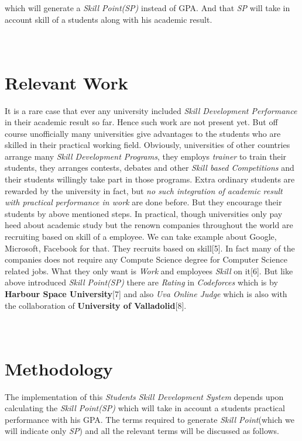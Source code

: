 \documentclass[conference]{IEEEtran}
\begin{document}
which will generate a \textit{Skill Point(SP)} instead of GPA. And that \textit{SP} will take in account skill of a students along with his academic result.\\\\\\ 


\section{Relevant Work}
It is a rare case that ever any university included \textit{Skill Development Performance} in their academic result so far. Hence such work are not present yet. But off course unofficially many universities give advantages to the students who are skilled in their practical working field. Obviously, universities of other countries arrange many \textit{Skill Development Programs}, they employs \textit{trainer} to train their students, they arranges contests, debates and other \textit{Skill based Competitions} and their students willingly take part in those programs. Extra ordinary students are rewarded by the university in fact, but \textit{no such integration of academic result with practical performance in work} are done before. But they encourage their students by above mentioned steps. In practical, though universities only pay heed about academic study but the renown companies throughout the world are recruiting based on skill of a employee. We can take example about Google, Microsoft, Facebook for that. They recruits based on skill[5]. In fact many of the companies does not require any Compute Science degree for Computer Science related jobs. What they only want is \textit{Work} and employees \textit{Skill} on it[6]. But like above introduced \textit{Skill Point(SP)} there are \textit{Rating} in \textit{Codeforces} which is by \textbf{Harbour Space University}[7] and also \textit{Uva Online Judge} which is also with the collaboration of \textbf{University of Valladolid}[8]. \\\\\\

\section{Methodology}
The implementation of this \textit{Students Skill Development System} depends upon calculating the \textit{Skill Point(SP)} which will take in account a students practical performance with his GPA. The terms required to generate \textit{Skill Point}(which we will indicate only \textit{SP}) and all the relevant terms will be discussed as follows.\\
\end{document}
